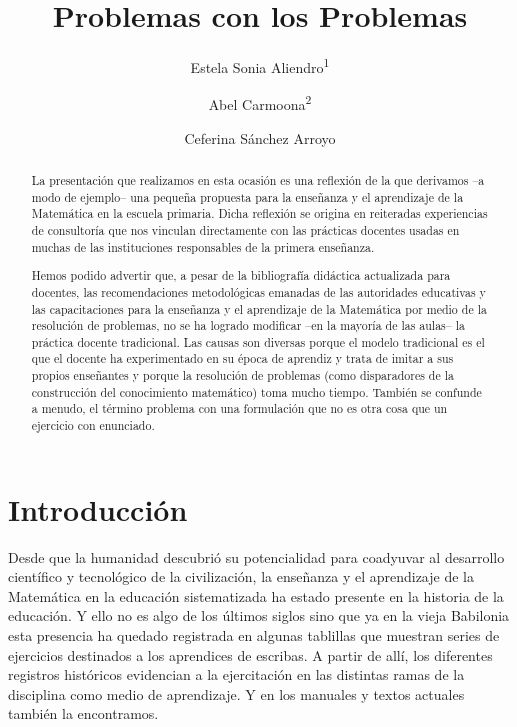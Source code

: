 \documentclass[oneside,spanish]{amsart}
\numberwithin{equation}{section}
\numberwithin{figure}{section}
\theoremstyle{definition}
\begin{document}
	
\title{Problemas con los Problemas\vspace{-2ex}}
\author[1]{Estela Sonia Aliendro\textsuperscript{1}}
\author[2]{Abel Carmoona\textsuperscript{2}}
\author[3]{Ceferina Sánchez Arroyo}
\address[2]{Universidad Nacional de Salta}

\begin{abstract}
	La presentación que realizamos en esta ocasión es una reflexión de la que derivamos --a modo de ejemplo-- una pequeña propuesta para la enseñanza y el aprendizaje de la Matemática en la escuela primaria. Dicha reflexión se origina en reiteradas  experiencias de consultoría que nos vinculan directamente con las prácticas docentes usadas en muchas de las instituciones responsables de la primera enseñanza.
	  
	Hemos podido advertir que, a pesar de la bibliografía didáctica actualizada para docentes, las recomendaciones metodológicas emanadas de las autoridades educativas y las capacitaciones para la enseñanza y el aprendizaje de la Matemática por medio de la resolución de problemas, no se ha logrado modificar --en la mayoría de las aulas-- la práctica docente tradicional. Las causas son diversas porque el modelo tradicional es el que el docente ha experimentado en su época de aprendiz y trata de imitar a sus propios enseñantes y porque la resolución de problemas (como disparadores de la construcción del conocimiento matemático) toma mucho tiempo. También se confunde a menudo, el término problema con  una formulación que no es otra cosa que un ejercicio con enunciado. 
\end{abstract}

\maketitle
\thispagestyle{empty}

\section{Introducción}

Desde que la humanidad descubrió su potencialidad para coadyuvar al desarrollo científico y tecnológico de la civilización, la enseñanza y el aprendizaje de la Matemática en la educación sistematizada ha estado presente en la historia de la educación. Y ello no es algo de los últimos siglos sino que ya en la vieja Babilonia esta presencia ha quedado registrada en algunas tablillas que muestran series de ejercicios destinados a los aprendices de escribas. A partir de allí, los diferentes registros históricos evidencian a la ejercitación en las distintas ramas de la disciplina como medio de aprendizaje. Y en los manuales y textos actuales también la encontramos.
\end{document}
